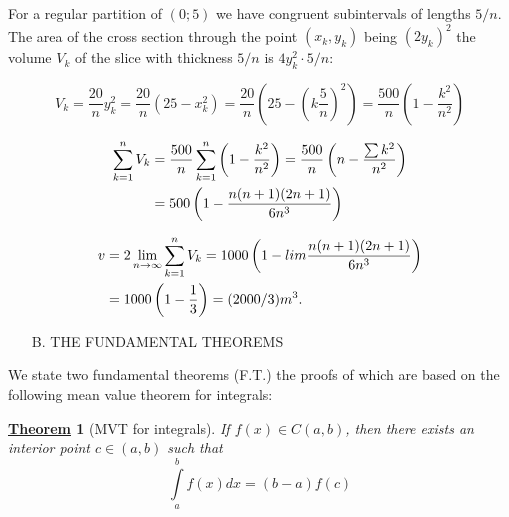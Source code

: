 \documentclass[11pt]{amsbook}
\newtheorem*{theorem}{\underline{Theorem}}
\begin{document}
\begin{exmp}
\begin{hSolution}
		For a regular partition of
		$ (0; 5) $
		we have congruent subintervals of lengths
		$ 5/n $.
		The area of the cross section through the point
		$ (x_{k}, y_{k}) $
		being
		$ (2y_{k})^{2} $
		the volume
		$ V_{k} $
		of the slice with thickness
		$ 5/n $
		is
		$ 4y_{k}^{2} \cdot 5/n $:

		\begin{equation}
			V_{k} 
			= \frac{20}{n} y_{k}^{2} 
			= \frac{20}{n} (25 - x_{k}^{2}) 
			= \frac{20}{n} ( 25 - \left( k \frac{5}{n} \right) ^{2} ) 
			= \frac{500}{n} \left( 1 - \frac{ k^{2} }{ n^{2} } \right)
		\end{equation}

		\begin{equation}
			\begin{split}
			\sum_{k=1}^{n} V_{k}
			& = \frac{500}{n} \sum_{k=1}^{n} \left( 1 - \frac{ k^{2} }{ n^{2} } \right) 
			  = \frac{500}{n} \left( n - \frac{ \sum k^{2} }{ n^{2} } \right)
			  \hNewLine
			& = 500 \left( 1 - \frac{n(n + 1)(2n + 1)}{6n^{3}} \right)
			\end{split}
		\end{equation}

		\begin{equation}
			\begin{split}
			v
			& = 2 \lim_{n \to \infty} \sum_{k=1}^{n} V_{k} 
			= 1000 \left( 1 - lim \frac{ n(n + 1)(2n + 1) }{ 6n^{3} } \right)
			\hNewLine
			& = 1000 \left( 1 - \frac{1}{3} \right) = ( 2000/3 ) m^{3}.
			\end{split}
		\end{equation}
	\end{hSolution}
\end{exmp}   

\begin{enumerate}
	\item[B.] THE FUNDAMENTAL THEOREMS
\end{enumerate}

We state two fundamental theorems (F.T.) the proofs of which are based on the following mean value theorem for integrals:

\begin{theorem}[MVT for integrals]
If $f(x)\in C(a,b)$, then there exists an interior point $c\in (a,b)$ such that $$\int\limits_{a}^{b} f(x)dx = (b-a)f(c)$$
\end{theorem}
\end{document}
